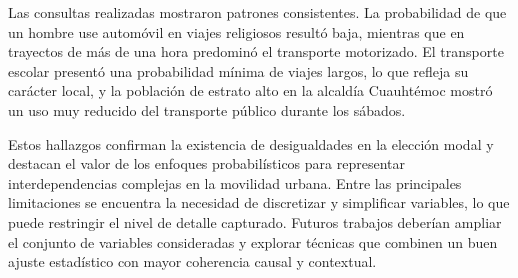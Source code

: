 \documentclass[eng]{ajceam-class}
\begin{document}
Las consultas realizadas mostraron patrones consistentes. La probabilidad de que un hombre use automóvil en viajes religiosos resultó baja, mientras que en trayectos de más de una hora predominó el transporte motorizado. El transporte escolar presentó una probabilidad mínima de viajes largos, lo que refleja su carácter local, y la población de estrato alto en la alcaldía Cuauhtémoc mostró un uso muy reducido del transporte público durante los sábados.

Estos hallazgos confirman la existencia de desigualdades en la elección modal y destacan el valor de los enfoques probabilísticos para representar interdependencias complejas en la movilidad urbana. Entre las principales limitaciones se encuentra la necesidad de discretizar y simplificar variables, lo que puede restringir el nivel de detalle capturado. Futuros trabajos deberían ampliar el conjunto de variables consideradas y explorar técnicas que combinen un buen ajuste estadístico con mayor coherencia causal y contextual.

\end{document}
